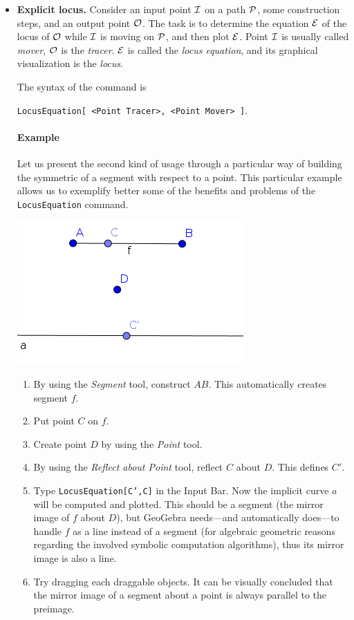 \documentclass{article}
\begin{document}
\begin{itemize}
\item\textbf{Explicit locus.}
Consider an input point $\cal{I}$ on a path $\cal{P}$, some construction steps, and an output point $\cal O$. The task is to determine the equation $\cal E$ of the locus of $\cal O$ while $\cal I$ is moving on $\cal P$, and then plot $\cal E$. Point $\cal I$ is usually called \textit{mover}, $\cal O$ is the \textit{tracer}. $\cal E$ is called the \textit{locus equation}, and its graphical visualization is the \textit{locus}.

The syntax of the command is
\begin{center}
    \texttt{LocusEquation[ <Point Tracer>, <Point Mover> ]}.
\end{center}

\paragraph{Example}
Let us present the second kind of usage through a particular way of
building the symmetric of a segment with respect to a point.
This particular example allows us to exemplify
better some of the benefits and problems of the \texttt{LocusEquation} command.
\begin{center}
\includegraphics[scale=0.5]{LocusEquation-example-explicit}
\end{center}
\begin{enumerate}
    \item By using the \textit{Segment} tool, construct $AB$. This automatically creates segment $f$.
    \item Put point $C$ on $f$.
    \item Create point $D$ by using the \textit{Point} tool.
    \item By using the \textit{Reflect about Point} tool, reflect $C$ about $D$. This defines $C'$.
    \item Type \texttt{LocusEquation[C',C]} in the Input Bar. Now the implicit curve $a$ will be computed and plotted. This should be a segment (the mirror image of $f$ about $D$), but GeoGebra needs---and automatically does---to handle $f$ as a line instead of a segment (for algebraic geometric reasons regarding the involved symbolic computation algorithms), thus its mirror image is also a line.
    \item Try dragging each draggable objects. It can be visually concluded that the mirror image of a segment about a point is always parallel to the preimage.
\end{enumerate}


\end{itemize}
\end{document}
